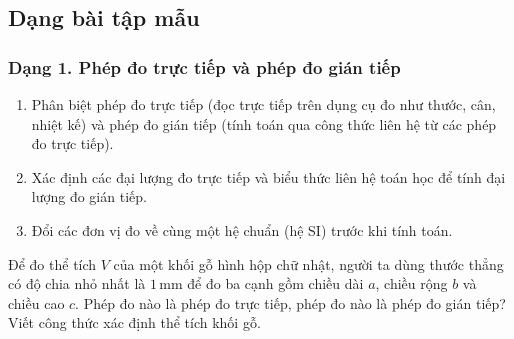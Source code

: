 

\subsection{Dạng bài tập mẫu}

\subsubsection{Dạng 1. Phép đo trực tiếp và phép đo gián tiếp}
\begin{phuongphap}
\begin{enumerate}
\item Phân biệt phép đo trực tiếp (đọc trực tiếp trên dụng cụ đo như thước, cân, nhiệt kế) và phép đo gián tiếp (tính toán qua công thức liên hệ từ các phép đo trực tiếp).
\item Xác định các đại lượng đo trực tiếp và biểu thức liên hệ toán học để tính đại lượng đo gián tiếp.
\item Đổi các đơn vị đo về cùng một hệ chuẩn (hệ SI) trước khi tính toán.
\end{enumerate}
\end{phuongphap}
\begin{vidumau}
Để đo thể tích $V$ của một khối gỗ hình hộp chữ nhật, người ta dùng thước thẳng có độ chia nhỏ nhất là $1\,\mathrm{mm}$ để đo ba cạnh gồm chiều dài $a$, chiều rộng $b$ và chiều cao $c$. Phép đo nào là phép đo trực tiếp, phép đo nào là phép đo gián tiếp? Viết công thức xác định thể tích khối gỗ.
\end{vidumau}


